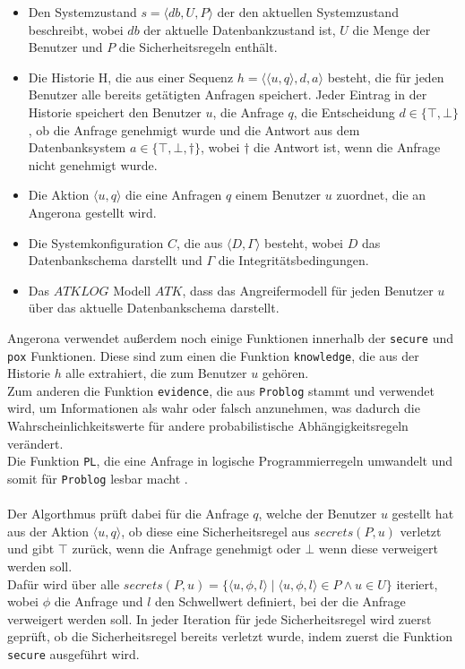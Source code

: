 \documentclass[german,version-2020-11]{uzl-thesis}
\begin{document}
\begin{itemize}
	\item Den Systemzustand $s=\langle db,U,P\rangle $ der den aktuellen Systemzustand beschreibt, wobei $db$ der aktuelle Datenbankzustand ist, $U$ die Menge der Benutzer und $P$ die Sicherheitsregeln enthält.
	\item Die Historie H, die aus einer Sequenz $h=\langle \langle u,q \rangle ,d,a \rangle$ besteht, die für jeden Benutzer alle bereits getätigten Anfragen speichert. Jeder Eintrag in der Historie speichert den Benutzer $u$, die Anfrage $q$, die Entscheidung $d \in \{\top, \bot \}$, ob die Anfrage genehmigt wurde und die Antwort aus dem Datenbanksystem $a \in \{\top, \bot , \dag \} $, wobei $\dag$ die Antwort ist, wenn die Anfrage nicht genehmigt wurde.
	\item Die Aktion $\langle u,q \rangle$ die eine Anfragen $q$ einem Benutzer $u$ zuordnet, die  an Angerona gestellt wird.
	\item Die Systemkonfiguration $C$, die aus $\langle D,\Gamma \rangle$ besteht, wobei $D$  das Datenbankschema darstellt und $\Gamma$ die Integritätsbedingungen. 
	\item  Das $ATKLOG$ Modell $ATK$, dass das Angreifermodell für jeden Benutzer $u$ über das aktuelle Datenbankschema darstellt.
\end{itemize}
Angerona verwendet außerdem noch einige Funktionen innerhalb der \texttt{secure} und \texttt{pox} Funktionen. Diese sind zum einen die Funktion \texttt{knowledge}, die aus der Historie $h$ alle extrahiert, die zum Benutzer $u$ gehören.\\
Zum anderen die Funktion \texttt{evidence}, die aus \texttt{Problog} stammt und verwendet wird, um Informationen als wahr oder falsch anzunehmen, was dadurch die Wahrscheinlichkeitswerte für andere probabilistische Abhängigkeitsregeln verändert.\\ 
Die Funktion \texttt{PL}, die  eine Anfrage in logische Programmierregeln umwandelt und somit für \texttt{Problog} lesbar macht \cite{guarnieri2017securing}.  \\ \\
Der Algorthmus prüft dabei für die Anfrage $q$, welche der Benutzer $u$ gestellt hat aus der Aktion $\langle u,q \rangle$, ob diese eine Sicherheitsregel aus $secrets(P,u)$ verletzt und gibt $\top$ zurück, wenn die Anfrage genehmigt oder $\bot$ wenn diese verweigert werden soll. \\ 
Dafür wird über alle  $secrets(P,u) = \{ \langle u,\phi,l \rangle \mid \langle u,\phi,l \rangle \in P \land u \in U\}$ iteriert, wobei $\phi$ die Anfrage und $l$ den Schwellwert definiert, bei der die Anfrage verweigert werden soll. In jeder Iteration für jede Sicherheitsregel wird zuerst geprüft, ob die Sicherheitsregel bereits verletzt wurde, indem zuerst die Funktion \texttt{secure} ausgeführt wird. \\ 
\end{document}
